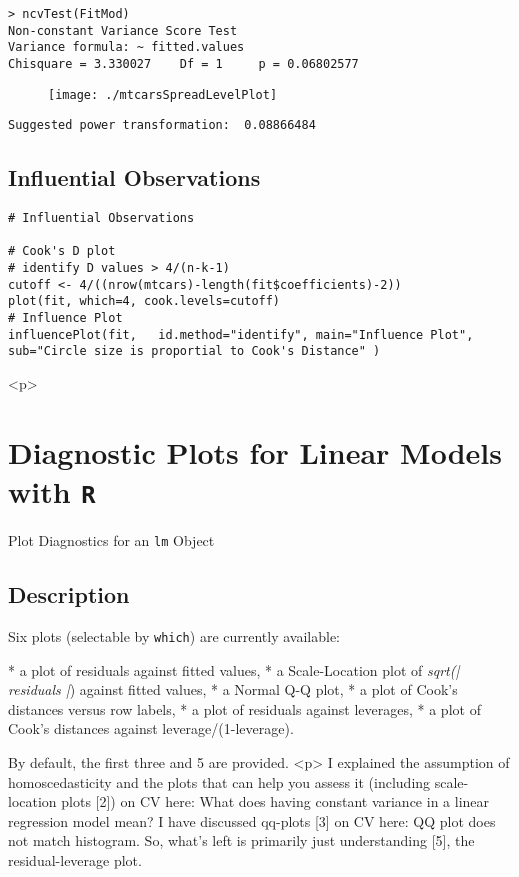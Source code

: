 \documentclass[main.tex]{subfiles}
\begin{document}
\begin{verbatim}
> ncvTest(FitMod)
Non-constant Variance Score Test 
Variance formula: ~ fitted.values 
Chisquare = 3.330027    Df = 1     p = 0.06802577 
\end{verbatim}


\begin{figure}[h!]
\centering
\texttt{[image: ./mtcarsSpreadLevelPlot]}
\label{mtcarsSpreadLevelPlot}
\end{figure}


\begin{verbatim}
Suggested power transformation:  0.08866484 
\end{verbatim}

\subsection{Influential Observations}
\begin{framed}
\begin{verbatim}
# Influential Observations

# Cook's D plot
# identify D values > 4/(n-k-1) 
cutoff <- 4/((nrow(mtcars)-length(fit$coefficients)-2)) 
plot(fit, which=4, cook.levels=cutoff)
# Influence Plot 
influencePlot(fit,	 id.method="identify", main="Influence Plot", sub="Circle size is proportial to Cook's Distance" )
\end{verbatim}
\end{framed}
<p>
\section{Diagnostic Plots for Linear Models with \texttt{R}}
Plot Diagnostics for an \texttt{lm} Object

\subsection{Description}

Six plots (selectable by \texttt{which}) are currently available: 
\begin{enumerate}
* a plot of residuals against fitted values, 
* a Scale-Location plot of \textit{sqrt(| residuals |}) against fitted values, 
* a Normal Q-Q plot, 
* a plot of Cook's distances versus row labels, 
* a plot of residuals against leverages, 
* a plot of Cook's distances against leverage/(1-leverage).
\end{enumerate} By default, the first three and 5 are provided.
<p>
 I explained the assumption of homoscedasticity and the plots that can help you assess it (including scale-location plots [2]) on CV here: What does having constant variance in a linear regression model mean? I have discussed qq-plots [3] on CV here: QQ plot does not match histogram. So, what's left is primarily just understanding [5], the residual-leverage plot.
\end{document}
